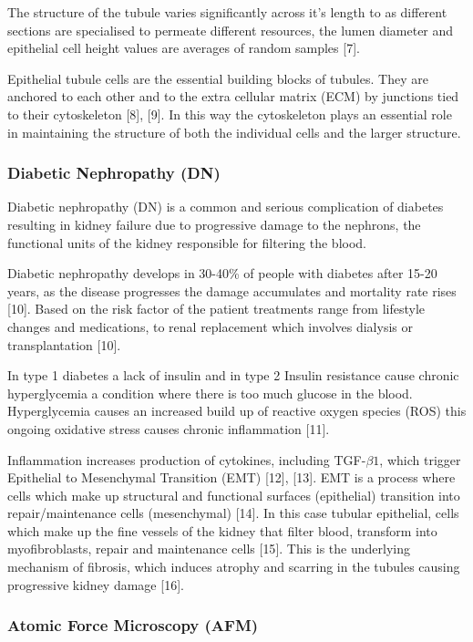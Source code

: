 \documentclass[
  paper=a4,
  ,captions=tableheading
]{scrartcl}
\begin{document}
The structure of the tubule varies significantly across it's length to
as different sections are specialised to permeate different resources,
the lumen diameter and epithelial cell height values are averages of
random samples {[}7{]}.

Epithelial tubule cells are the essential building blocks of tubules.
They are anchored to each other and to the extra cellular matrix (ECM)
by junctions tied to their cytoskeleton {[}8{]}, {[}9{]}. In this way
the cytoskeleton plays an essential role in maintaining the structure of
both the individual cells and the larger structure.

\subsubsection{Diabetic Nephropathy (DN)}\label{diabetic-nephropathy-dn}

Diabetic nephropathy (DN) is a common and serious complication of
diabetes resulting in kidney failure due to progressive damage to the
nephrons, the functional units of the kidney responsible for filtering
the blood.

Diabetic nephropathy develops in 30-40\% of people with diabetes after
15-20 years, as the disease progresses the damage accumulates and
mortality rate rises {[}10{]}. Based on the risk factor of the patient
treatments range from lifestyle changes and medications, to renal
replacement which involves dialysis or transplantation {[}10{]}.

In type 1 diabetes a lack of insulin and in type 2 Insulin resistance
cause chronic hyperglycemia a condition where there is too much glucose
in the blood. Hyperglycemia causes an increased build up of reactive
oxygen species (ROS) this ongoing oxidative stress causes chronic
inflammation {[}11{]}.

Inflammation increases production of cytokines, including
TGF-\(\beta 1\), which trigger Epithelial to Mesenchymal Transition
(EMT) {[}12{]}, {[}13{]}. EMT is a process where cells which make up
structural and functional surfaces (epithelial) transition into
repair/maintenance cells (mesenchymal) {[}14{]}. In this case tubular
epithelial, cells which make up the fine vessels of the kidney that
filter blood, transform into myofibroblasts, repair and maintenance
cells {[}15{]}. This is the underlying mechanism of fibrosis, which
induces atrophy and scarring in the tubules causing progressive kidney
damage {[}16{]}.

\subsubsection{Atomic Force Microscopy
(AFM)}\label{atomic-force-microscopy-afm}
\end{document}
